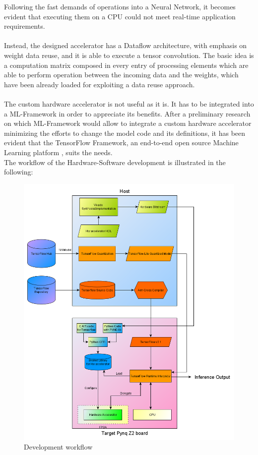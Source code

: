 Following the fast demands of operations into a Neural Network, it becomes evident that executing them on a CPU could not meet real-time application requirements.\\\\
Instead, the designed accelerator has a Dataflow architecture, with emphasis on weight data reuse, and it is able to execute a tensor convolution. The basic idea is a computation matrix composed in every entry of processing elements which are able to perform operation between the incoming data and the weights, which have been already loaded for exploiting a data reuse approach.\\\\
The custom hardware accelerator is not useful as it is. It has to be integrated into a ML-Framework in order to appreciate its benefits. After a preliminary research on which ML-Framework would allow to integrate a custom hardware accelerator minimizing the efforts to change the model code and its definitions, it has been evident that the TensorFlow Framework, an end-to-end open source Machine Learning platform \cite{WEBSITE:4}, suits the needs.\\
\newpage
The workflow of the Hardware-Software development is illustrated in the following:
\begin{figure}[!htbp]
\centering
\captionsetup{justification=centering}
\includegraphics[scale=0.5]{./figure/workflow.png}
\caption{Development workflow}
\label{fig:workflow}
\end{figure}

